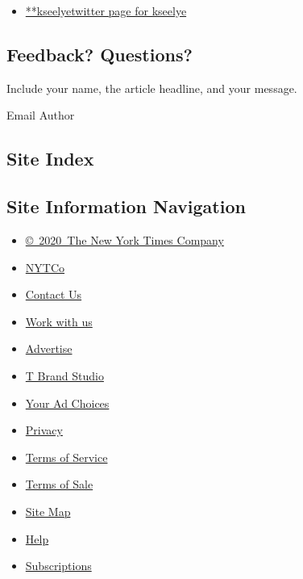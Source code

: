 \begin{itemize}
\tightlist
\item
  \href{https://twitter.com/kseelye}{**kseelyetwitter page for kseelye}
\end{itemize}

\hypertarget{feedback-questions}{%
\subsection{Feedback? Questions?}\label{feedback-questions}}

Include your name, the article headline, and your message.

Email Author

\hypertarget{site-index}{%
\subsection{Site Index}\label{site-index}}

\hypertarget{site-information-navigation}{%
\subsection{Site Information
Navigation}\label{site-information-navigation}}

\begin{itemize}
\tightlist
\item
  \href{https://help.nytimes.com/hc/en-us/articles/115014792127-Copyright-notice}{©~2020~The
  New York Times Company}
\end{itemize}

\begin{itemize}
\tightlist
\item
  \href{https://www.nytco.com/}{NYTCo}
\item
  \href{https://help.nytimes.com/hc/en-us/articles/115015385887-Contact-Us}{Contact
  Us}
\item
  \href{https://www.nytco.com/careers/}{Work with us}
\item
  \href{https://nytmediakit.com/}{Advertise}
\item
  \href{http://www.tbrandstudio.com/}{T Brand Studio}
\item
  \href{https://www.nytimes.com/privacy/cookie-policy\#how-do-i-manage-trackers}{Your
  Ad Choices}
\item
  \href{https://www.nytimes.com/privacy}{Privacy}
\item
  \href{https://help.nytimes.com/hc/en-us/articles/115014893428-Terms-of-service}{Terms
  of Service}
\item
  \href{https://help.nytimes.com/hc/en-us/articles/115014893968-Terms-of-sale}{Terms
  of Sale}
\item
  \href{https://spiderbites.nytimes.com}{Site Map}
\item
  \href{https://help.nytimes.com/hc/en-us}{Help}
\item
  \href{https://www.nytimes.com/subscription?campaignId=37WXW}{Subscriptions}
\end{itemize}
